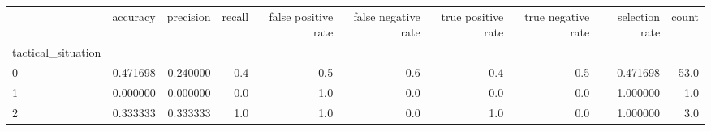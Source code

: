 \begin{tabular}{lrrrrrrrrr}
\toprule
{} &  accuracy &  precision &  recall &  false positive rate &  false negative rate &  true positive rate &  true negative rate &  selection rate &  count \\
tactical\_situation &           &            &         &                      &                      &                     &                     &                 &        \\
\midrule
0                  &  0.471698 &   0.240000 &     0.4 &                  0.5 &                  0.6 &                 0.4 &                 0.5 &        0.471698 &   53.0 \\
1                  &  0.000000 &   0.000000 &     0.0 &                  1.0 &                  0.0 &                 0.0 &                 0.0 &        1.000000 &    1.0 \\
2                  &  0.333333 &   0.333333 &     1.0 &                  1.0 &                  0.0 &                 1.0 &                 0.0 &        1.000000 &    3.0 \\
\bottomrule
\end{tabular}
